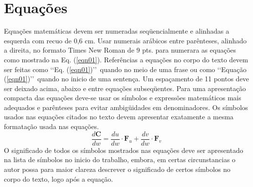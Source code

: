 \section{Equações}
Equações matemáticas devem ser numeradas seqüencialmente e alinhadas a
esquerda com recuo de 0,6 cm. Usar numerais arábicos entre parênteses,
alinhado a direita, no formato Times New Roman de 9 pts. para numerara as
equações como mostrado na Eq. (\ref{eqn01}).
Referências a equações no corpo do texto devem ser feitas como \lq\lq Eq.
(\ref{eqn01})\rq\rq\ quando no meio de uma frase ou como \lq\lq Equação
(\ref{eqn01})\rq\rq\ quando no inicio de uma sentença. Um espaçamento de 11
pontos deve ser deixado acima, abaixo e entre equações subseqüentes. Para uma
apresentação compacta das equações deve-se usar os símbolos e expressões
matemáticos mais adequados e parênteses para evitar ambigüidades em
denominadores. Os símbolos usados nas equações citados no texto devem
apresentar exatamente a mesma formatação usada nas equações.
\begin{equation}
\label{eqn01}
\frac{d\mathbf{C}}{dw} = \frac{du}{dw}\cdot \mathbf{F}_u +
\frac{dv}{dw}\cdot \mathbf{F}_v
\end{equation}
O significado de todos os símbolos mostrados nas equações deve ser apresentado
na lista de símbolos no inicio do trabalho, embora, em certas circunstancias o
autor possa para maior clareza descrever o significado de certos símbolos no
corpo do texto, logo após a equação.
